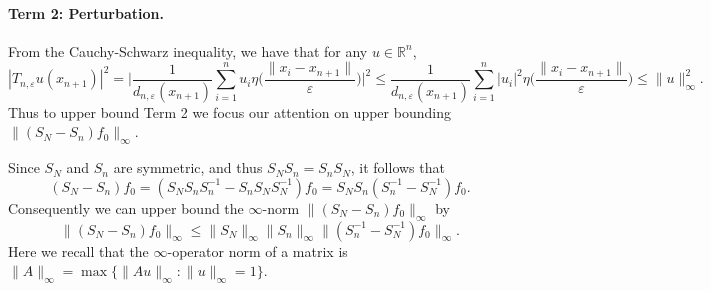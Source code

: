 \documentclass{article}
\newcommand{\Reals}{\mathbb{R}}
\newcommand{\1}{\mathbf{1}}
\theoremstyle{alden}
\theoremstyle{aldenthm}
\theoremstyle{definition}
\theoremstyle{remark}
\begin{document}
\paragraph{Term 2: Perturbation.}
From the Cauchy-Schwarz inequality, we have that for any $u \in \Reals^n$,
\begin{equation*}
|T_{n,\varepsilon}u(x_{n + 1})|^2 = \biggl|\frac{1}{d_{n,\varepsilon}(x_{n + 1})} \sum_{i = 1}^{n} u_i \eta\biggl(\frac{\|x_i - x_{n + 1}\|}{\varepsilon}\biggr)\biggr|^2 \leq \frac{1}{d_{n,\varepsilon}(x_{n + 1})} \sum_{i = 1}^{n} |u_i|^2 \eta\biggl(\frac{\|x_{i} - x_{n + 1}\|}{\varepsilon}\biggr) \leq \|u\|_{\infty}^2.
\end{equation*}
Thus to upper bound Term 2 we focus our attention on upper bounding $\|(S_N - S_n)f_0\|_{\infty}$. 

Since $S_N$ and $S_n$ are symmetric, and thus $S_NS_n = S_nS_N$, it follows that
\begin{equation*}
(S_N - S_n)f_0 = (S_NS_nS_n^{-1} - S_nS_NS_N^{-1})f_0 = S_N S_n(S_n^{-1} - S_N^{-1})f_0.
\end{equation*}
Consequently we can upper bound the $\infty$-norm $\|(S_N - S_n)f_0\|_{\infty}$ by
\begin{equation*}
\|(S_N - S_n)f_0\|_{\infty} \leq \|S_N\|_{\infty} \|S_n\|_{\infty} \|(S_n^{-1} - S_N^{-1})f_0\|_{\infty}.
\end{equation*}
Here we recall that the $\infty$-operator norm of a matrix is $\|A\|_{\infty} = \max\{\|Au\|_{\infty}:\|u\|_{\infty} = 1\}$. 
\end{document}

